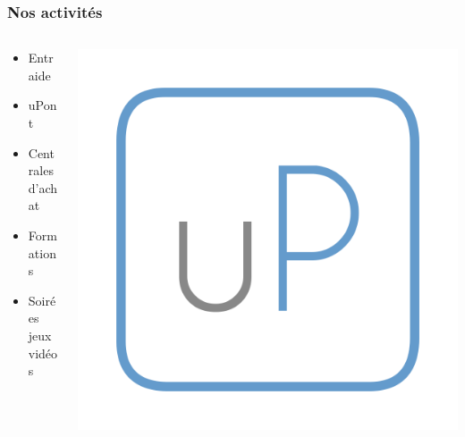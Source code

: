 \documentclass[14pt]{beamer}
\begin{document}
\begin{frame}
    \frametitle{Nos activités}
    \begin{columns}
        \begin{column}{.5\textwidth}
            \begin{itemize}
                \item Entraide
                \item uPont
                \item Centrales d'achat
                \item Formations
                \item Soirées jeux vidéos
            \end{itemize}
        \end{column}
        \begin{column}{.5\textwidth}
        \includegraphics[width=\textwidth]{upont.png}
        \end{column}
    \end{columns}
\end{frame}
\end{document}
